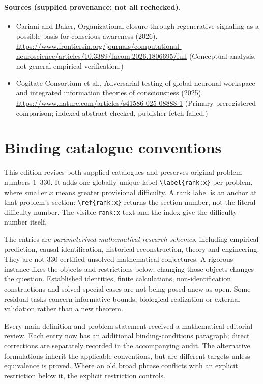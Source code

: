 \documentclass[11pt]{article}
\begin{document}
\paragraph{Sources (supplied provenance; not all rechecked).} \begin{itemize}
\item Cariani and Baker, Organizational closure through regenerative signaling as a possible basis for conscious awareness (2026). \url{https://www.frontiersin.org/journals/computational-neuroscience/articles/10.3389/fncom.2026.1806695/full} (Conceptual analysis, not general empirical verification.)
\item Cogitate Consortium et al., Adversarial testing of global neuronal workspace and integrated information theories of consciousness (2025). \url{https://www.nature.com/articles/s41586-025-08888-1} (Primary preregistered comparison; indexed abstract checked, publisher fetch failed.)
\end{itemize}


\section*{Binding catalogue conventions}
This edition revises both supplied catalogues and preserves original problem numbers 1--330. It adds one globally unique label \verb|\label{rank:x}| per problem, where smaller $x$ means greater provisional difficulty. A rank label is an anchor at that problem's section: \verb|\ref{rank:x}| returns the section number, not the literal difficulty number. The visible \texttt{rank:x} text and the index give the difficulty number itself.

The entries are \emph{parameterized mathematical research schemes}, including empirical prediction, causal identification, historical reconstruction, theory and engineering. They are not 330 certified unsolved mathematical conjectures. A rigorous instance fixes the objects and restrictions below; changing those objects changes the question. Established identities, finite calculations, non-identification constructions and solved special cases are not being posed anew as open. Some residual tasks concern informative bounds, biological realization or external validation rather than a new theorem.

Every main definition and problem statement received a mathematical editorial review. Each entry now has an additional binding-conditions paragraph; direct corrections are separately recorded in the accompanying audit. The alternative formulations inherit the applicable conventions, but are different targets unless equivalence is proved. Where an old broad phrase conflicts with an explicit restriction below it, the explicit restriction controls.
\end{document}
